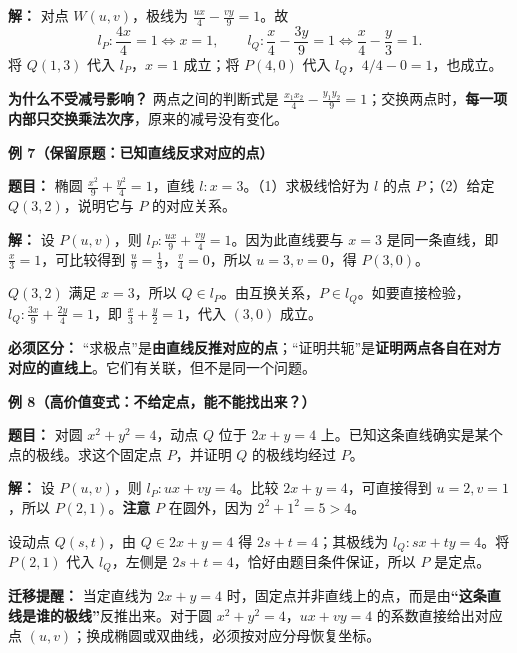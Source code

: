 \begin{examplebox}
\textbf{解：} 对点 $W(u,v)$，极线为 $\frac{ux}{4}-\frac{vy}{9}=1$。故
\[
l_P:\frac{4x}{4}=1\iff x=1,
\qquad
l_Q:\frac{x}{4}-\frac{3y}{9}=1\iff\frac{x}{4}-\frac{y}{3}=1.
\]
将 $Q(1,3)$ 代入 $l_P$，$x=1$ 成立；将 $P(4,0)$ 代入 $l_Q$，$4/4-0=1$，也成立。

\textbf{为什么不受减号影响？} 两点之间的判断式是 $\frac{x_1x_2}{4}-\frac{y_1y_2}{9}=1$；交换两点时，\textbf{每一项内部只交换乘法次序}，原来的减号没有变化。

\medskip
\textbf{\textcolor{CExample}{例 7（保留原题：已知直线反求对应的点）}}

\textbf{题目：} 椭圆 $\frac{x^2}{9}+\frac{y^2}{4}=1$，直线 $l:x=3$。（1）求极线恰好为 $l$ 的点 $P$；（2）给定 $Q(3,2)$，说明它与 $P$ 的对应关系。

\textbf{解：} 设 $P(u,v)$，则 $l_P:\frac{ux}{9}+\frac{vy}{4}=1$。因为此直线要与 $x=3$ 是同一条直线，即 $\frac{x}{3}=1$，可比较得到 $\frac{u}{9}=\frac13$，$\frac{v}{4}=0$，所以 $u=3,v=0$，得 $P(3,0)$。

$Q(3,2)$ 满足 $x=3$，所以 $Q\in l_P$。由互换关系，$P\in l_Q$。如要直接检验，$l_Q:\frac{3x}{9}+\frac{2y}{4}=1$，即 $\frac{x}{3}+\frac{y}{2}=1$，代入 $(3,0)$ 成立。

\textbf{必须区分：} “求极点”是\textbf{由直线反推对应的点}；“证明共轭”是\textbf{证明两点各自在对方对应的直线上}。它们有关联，但不是同一个问题。

\medskip
\textbf{\textcolor{CExample}{例 8（高价值变式：不给定点，能不能找出来？）}}

\textbf{题目：} 对圆 $x^2+y^2=4$，动点 $Q$ 位于 $2x+y=4$ 上。已知这条直线确实是某个点的极线。求这个固定点 $P$，并证明 $Q$ 的极线均经过 $P$。

\textbf{解：} 设 $P(u,v)$，则 $l_P:ux+vy=4$。比较 $2x+y=4$，可直接得到 $u=2,v=1$，所以 $P(2,1)$。\textbf{注意} $P$ 在圆外，因为 $2^2+1^2=5>4$。

设动点 $Q(s,t)$，由 $Q\in 2x+y=4$ 得 $2s+t=4$；其极线为 $l_Q:sx+ty=4$。将 $P(2,1)$ 代入 $l_Q$，左侧是 $2s+t=4$，恰好由题目条件保证，所以 $P$ 是定点。

\textbf{迁移提醒：} 当定直线为 $2x+y=4$ 时，固定点并非直线上的点，而是由\textbf{“这条直线是谁的极线”}反推出来。对于圆 $x^2+y^2=4$，$ux+vy=4$ 的系数直接给出对应点 $(u,v)$；换成椭圆或双曲线，必须按对应分母恢复坐标。
\end{examplebox}
